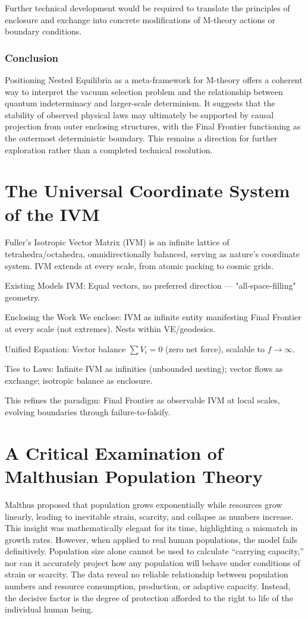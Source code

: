 Further technical development would be required to translate the principles of enclosure and exchange into concrete modifications of M-theory actions or boundary conditions.

\subsection{Conclusion}

Positioning Nested Equilibria as a meta-framework for M-theory offers a coherent way to interpret the vacuum selection problem and the relationship between quantum indeterminacy and larger-scale determinism. It suggests that the stability of observed physical laws may ultimately be supported by causal projection from outer enclosing structures, with the Final Frontier functioning as the outermost deterministic boundary. This remains a direction for further exploration rather than a completed technical resolution.

\chapter{The Universal Coordinate System of the IVM}

Fuller's Isotropic Vector Matrix (IVM) is an infinite lattice of tetrahedra/octahedra, omnidirectionally balanced, serving as nature's coordinate system. IVM extends at every scale, from atomic packing to cosmic grids.

Existing Models  
IVM: Equal vectors, no preferred direction — "all-space-filling" geometry.

Enclosing the Work  
We enclose: IVM as infinite entity manifesting Final Frontier at every scale (not extremes). Nests within VE/geodesics.

Unified Equation: Vector balance $\sum V_i = 0$ (zero net force), scalable to $f \to \infty$.

Ties to Laws: Infinite IVM as infinities (unbounded nesting); vector flows as exchange; isotropic balance as enclosure.

This refines the paradigm: Final Frontier as observable IVM at local scales, evolving boundaries through failure-to-falsify.

\chapter{A Critical Examination of Malthusian Population Theory}

Malthus proposed that population grows exponentially while resources grow linearly, leading to inevitable strain, scarcity, and collapse as numbers increase. This insight was mathematically elegant for its time, highlighting a mismatch in growth rates. However, when applied to real human populations, the model fails definitively. Population size alone cannot be used to calculate “carrying capacity,” nor can it accurately project how any population will behave under conditions of strain or scarcity. The data reveal no reliable relationship between population numbers and resource consumption, production, or adaptive capacity. Instead, the decisive factor is the degree of protection afforded to the right to life of the individual human being.

